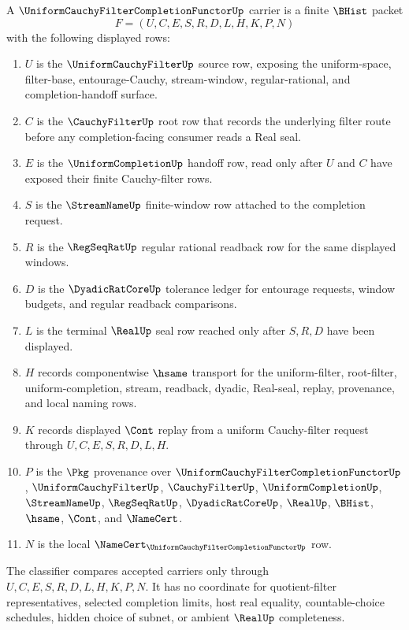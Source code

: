 \begin{definition}
\label{def:uniform-cauchy-filter-completion-functor-carrier}
A $\UniformCauchyFilterCompletionFunctorUp$ carrier is a finite $\BHist$ packet
$$
F=(U,C,E,S,R,D,L,H,K,P,N)
$$
with the following displayed rows:
\begin{enumerate}
\item $U$ is the $\UniformCauchyFilterUp$ source row, exposing the uniform-space, filter-base, entourage-Cauchy, stream-window, regular-rational, and completion-handoff surface.
\item $C$ is the $\CauchyFilterUp$ root row that records the underlying filter route before any completion-facing consumer reads a Real seal.
\item $E$ is the $\UniformCompletionUp$ handoff row, read only after $U$ and $C$ have exposed their finite Cauchy-filter rows.
\item $S$ is the $\StreamNameUp$ finite-window row attached to the completion request.
\item $R$ is the $\RegSeqRatUp$ regular rational readback row for the same displayed windows.
\item $D$ is the $\DyadicRatCoreUp$ tolerance ledger for entourage requests, window budgets, and regular readback comparisons.
\item $L$ is the terminal $\RealUp$ seal row reached only after $S,R,D$ have been displayed.
\item $H$ records componentwise $\hsame$ transport for the uniform-filter, root-filter, uniform-completion, stream, readback, dyadic, Real-seal, replay, provenance, and local naming rows.
\item $K$ records displayed $\Cont$ replay from a uniform Cauchy-filter request through $U,C,E,S,R,D,L,H$.
\item $P$ is the $\Pkg$ provenance over $\UniformCauchyFilterCompletionFunctorUp$, $\UniformCauchyFilterUp$, $\CauchyFilterUp$, $\UniformCompletionUp$, $\StreamNameUp$, $\RegSeqRatUp$, $\DyadicRatCoreUp$, $\RealUp$, $\BHist$, $\hsame$, $\Cont$, and $\NameCert$.
\item $N$ is the local $\NameCert_{\UniformCauchyFilterCompletionFunctorUp}$ row.
\end{enumerate}
The classifier compares accepted carriers only through $U,C,E,S,R,D,L,H,K,P,N$. It has no coordinate for quotient-filter representatives, selected completion limits, host real equality, countable-choice schedules, hidden choice of subnet, or ambient $\RealUp$ completeness.
\end{definition}

